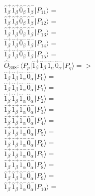 \documentclass[14pt]{article}
\begin{document}
    $ \hat{1}_{\beta}^{+}\hat{1}_{\beta}^{+}\hat{0}_{\beta}^{-}\hat{1}_{\beta}^{-} \vert{P_{11}}\rangle =  $ \\ 
    $ \hat{1}_{\beta}^{+}\hat{1}_{\beta}^{+}\hat{0}_{\beta}^{-}\hat{1}_{\beta}^{-} \vert{P_{12}}\rangle =  $ \\ 
    $ \hat{1}_{\beta}^{+}\hat{1}_{\beta}^{+}\hat{0}_{\beta}^{-}\hat{1}_{\beta}^{-} \vert{P_{13}}\rangle =  $ \\ 
    $ \hat{1}_{\beta}^{+}\hat{1}_{\beta}^{+}\hat{0}_{\beta}^{-}\hat{1}_{\beta}^{-} \vert{P_{14}}\rangle =  $ \\ 
    $ \hat{1}_{\beta}^{+}\hat{1}_{\beta}^{+}\hat{0}_{\beta}^{-}\hat{1}_{\beta}^{-} \vert{P_{15}}\rangle =  $ \\ 
    
    $\hat{O}_{308}:  \langle{P_p}\vert \hat{1}_{\beta}^{+}\hat{1}_{\beta}^{+}\hat{1}_{\alpha}^{-}\hat{0}_{\alpha}^{-} \vert{P_q}\rangle => $ \\ 
    $ \hat{1}_{\beta}^{+}\hat{1}_{\beta}^{+}\hat{1}_{\alpha}^{-}\hat{0}_{\alpha}^{-} \vert{P_{0}}\rangle =  $ \\ 
    $ \hat{1}_{\beta}^{+}\hat{1}_{\beta}^{+}\hat{1}_{\alpha}^{-}\hat{0}_{\alpha}^{-} \vert{P_{1}}\rangle =  $ \\ 
    $ \hat{1}_{\beta}^{+}\hat{1}_{\beta}^{+}\hat{1}_{\alpha}^{-}\hat{0}_{\alpha}^{-} \vert{P_{2}}\rangle =  $ \\ 
    $ \hat{1}_{\beta}^{+}\hat{1}_{\beta}^{+}\hat{1}_{\alpha}^{-}\hat{0}_{\alpha}^{-} \vert{P_{3}}\rangle =  $ \\ 
    $ \hat{1}_{\beta}^{+}\hat{1}_{\beta}^{+}\hat{1}_{\alpha}^{-}\hat{0}_{\alpha}^{-} \vert{P_{4}}\rangle =  $ \\ 
    $ \hat{1}_{\beta}^{+}\hat{1}_{\beta}^{+}\hat{1}_{\alpha}^{-}\hat{0}_{\alpha}^{-} \vert{P_{5}}\rangle =  $ \\ 
    $ \hat{1}_{\beta}^{+}\hat{1}_{\beta}^{+}\hat{1}_{\alpha}^{-}\hat{0}_{\alpha}^{-} \vert{P_{6}}\rangle =  $ \\ 
    $ \hat{1}_{\beta}^{+}\hat{1}_{\beta}^{+}\hat{1}_{\alpha}^{-}\hat{0}_{\alpha}^{-} \vert{P_{7}}\rangle =  $ \\ 
    $ \hat{1}_{\beta}^{+}\hat{1}_{\beta}^{+}\hat{1}_{\alpha}^{-}\hat{0}_{\alpha}^{-} \vert{P_{8}}\rangle =  $ \\ 
    $ \hat{1}_{\beta}^{+}\hat{1}_{\beta}^{+}\hat{1}_{\alpha}^{-}\hat{0}_{\alpha}^{-} \vert{P_{9}}\rangle =  $ \\ 
    $ \hat{1}_{\beta}^{+}\hat{1}_{\beta}^{+}\hat{1}_{\alpha}^{-}\hat{0}_{\alpha}^{-} \vert{P_{10}}\rangle =  $ \\ 
\end{document}

